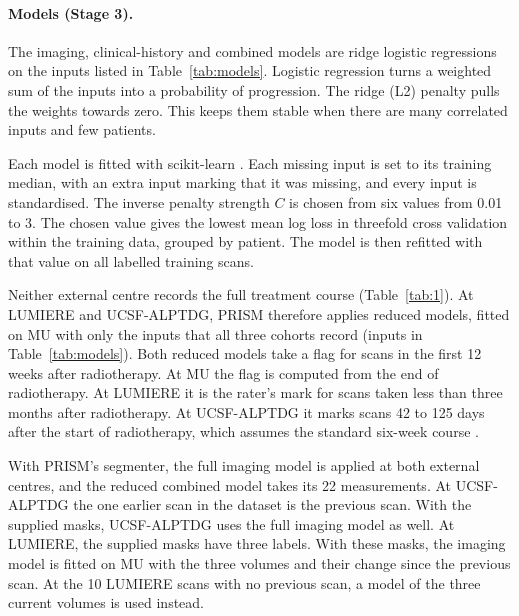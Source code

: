 \documentclass[largeformat]{interact} %
\begin{document}
\paragraph*{Models (Stage 3).} The imaging, clinical-history and combined models are ridge logistic regressions \citep{lecessie1992} on the
inputs listed in Table~\ref{tab:models}. Logistic regression turns a weighted sum of the inputs into a probability of
progression. The ridge (L2) penalty pulls the weights towards zero. This keeps them stable when there are many
correlated inputs and few patients.

Each model is fitted with scikit-learn \citep{pedregosa2011}. Each missing input is set to its training median,
with an extra input marking that it was missing, and every input is standardised. The inverse penalty strength $C$ is
chosen from six values from 0.01 to 3. The chosen value gives the lowest mean log loss in threefold cross
validation within the training data, grouped by patient. The model is then refitted with that value on all labelled
training scans.

Neither external centre records the full treatment course (Table~\ref{tab:1}). At LUMIERE and UCSF-ALPTDG, PRISM
therefore applies reduced models, fitted on MU with only the inputs that all three cohorts record (inputs in
Table~\ref{tab:models}). Both reduced models take a flag for scans in the first 12 weeks after radiotherapy. At MU the
flag is computed from the end of radiotherapy. At LUMIERE it is the rater's mark for scans taken less than three
months after radiotherapy. At UCSF-ALPTDG it marks scans 42 to 125 days after the start of radiotherapy, which assumes the standard six-week course \citep{stupp2005}.

With PRISM's segmenter, the full imaging model is applied at both external centres, and the reduced combined model
takes its 22 measurements. At UCSF-ALPTDG the one earlier scan in the dataset is the previous scan. With the supplied
masks, UCSF-ALPTDG uses the full imaging model as well. At LUMIERE, the supplied masks have three labels. With
these masks, the imaging model is fitted on MU with the three volumes and their change since the previous scan. At the
10 LUMIERE scans with no previous scan, a model of the three current volumes is used instead.

\end{document}
